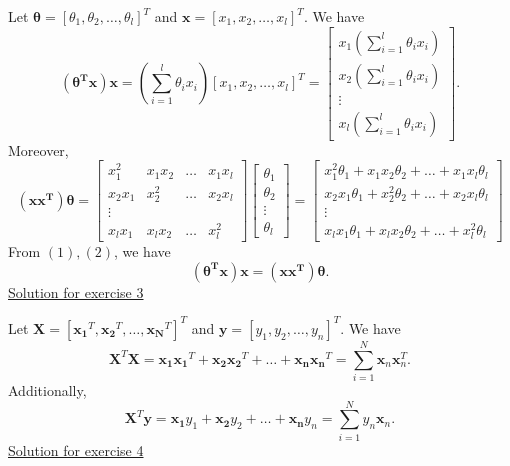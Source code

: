 \documentclass[12pt]{book}
\theoremstyle{definition}
\begin{document}
\noindent
Let $\bm{\theta} = [\theta_1,\theta_2,\dots,\theta_l]^T$ and $\bm{x} = [x_1,x_2,\dots,x_l]^T$. We have
\begin{equation}
\bm{(\theta^Tx)x} = \left( \sum_{i=1}^l\theta_ix_i \right) [x_1,x_2,\dots,x_l]^T =
\begin{bmatrix}
x_{1}\left( \sum_{i=1}^l\theta_ix_i \right) \\
x_{2}\left( \sum_{i=1}^l\theta_ix_i \right) \\
\vdots \\
x_{l}\left( \sum_{i=1}^l\theta_ix_i \right)
\end{bmatrix}.
\end{equation}
Moreover,
\begin{equation}
\bm{(xx^T)\theta} =
\begin{bmatrix}
x_{1}^2 & x_1x_2 & \dots & x_1x_l \\
x_2x_1 & x_2^2 & \dots & x_2x_l \\
\vdots \\
x_{l}x_1 & x_lx_2 & \dots & x_l^2
\end{bmatrix}
\begin{bmatrix}
\theta_1 \\
\theta_2\\
\vdots \\
\theta_l
\end{bmatrix}
 =
  \begin{bmatrix}
  x_1^2\theta_1 + x_1x_2\theta_2 + \dots +x_1x_l\theta_l \\
  x_2x_1\theta_1 + x_2^2\theta_2 + \dots +x_2x_l\theta_l\\
  \vdots \\
  x_lx_1\theta_1 + x_lx_2\theta_2 + \dots +x_l^2\theta_l
  \end{bmatrix}
\end{equation}
From $(1),(2)$, we have
\begin{equation*}
\bm{(\theta^Tx)x} = \bm{(xx^T)\theta}.
\end{equation*} 
\vspace{0.5 cm}
{\underline{\large Solution for exercise 3}}
\vspace{0.3 cm}

\noindent
Let $\bm{X} = [\bm{x_1}^T,\bm{x_2}^T,\dots,\bm{x_N}^T]^T$ and $\bm{y}=[y_1,y_2,\dots,y_n]^T$. We have
\begin{equation*}
\bm{X}^T\bm{X} = \bm{x_1x_1}^T + \bm{x_2x_2}^T + \dots + \bm{x_nx_n}^T = \sum_{i=1}^{N}\bm{x}_n\bm{x}_n^T.
\end{equation*}
Additionally,
\begin{equation*}
\bm{X}^T\bm{y} = \bm{x_1}y_1 + \bm{x_2}y_2 + \dots + \bm{x_n}y_n = \sum_{i=1}^{N}y_n\bm{x}_n.
\end{equation*}
\vspace{0.5 cm}
{\underline{\large Solution for exercise 4}}
\vspace{0.3 cm}
\end{document}
